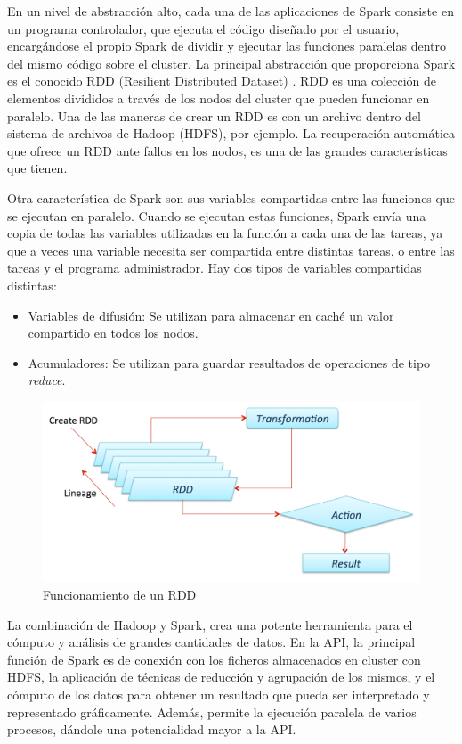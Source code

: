 En un nivel de abstracción alto, cada una de las aplicaciones de Spark consiste en un programa controlador, que ejecuta el código diseñado por el usuario, encargándose el propio Spark de dividir y ejecutar las funciones paralelas dentro del mismo código sobre el cluster.
La principal abstracción que proporciona Spark es el conocido RDD (Resilient Distributed Dataset) \cite{SparkRDD}. RDD es una colección de elementos divididos a través de los nodos del cluster que pueden funcionar en paralelo. Una de las maneras de crear un RDD es con un archivo dentro del sistema de archivos de Hadoop (HDFS), por ejemplo. La recuperación automática que ofrece un RDD ante fallos en los nodos, es una de las grandes características que tienen. 

Otra característica de Spark son sus variables compartidas entre las funciones que se ejecutan en paralelo. Cuando se ejecutan estas funciones, Spark envía una copia de todas las variables utilizadas en la función a cada una de las tareas, ya que a veces una variable necesita ser compartida entre distintas tareas, o entre las tareas y el programa administrador. Hay dos tipos de variables compartidas distintas:
\begin{itemize}
	\item Variables de difusión: Se utilizan para almacenar en caché un valor compartido en todos los nodos.
	\item Acumuladores: Se utilizan para guardar resultados de operaciones de tipo \textit{reduce}.
\end{itemize}

\begin{figure}
	\centering
	\includegraphics[width=1\linewidth]{imagenes/spark_rdd}
	\caption{Funcionamiento de un RDD \cite{SparkRDDFuncionamiento}}
	\label{fig:sparkrdd}
\end{figure}

La combinación de Hadoop y Spark, crea una potente herramienta para el cómputo y análisis de grandes cantidades de datos. En la API, la principal función de Spark es de conexión con los ficheros almacenados en cluster con HDFS, la aplicación de técnicas de reducción y agrupación de los mismos, y el cómputo de los datos para obtener un resultado que pueda ser interpretado y representado gráficamente.
Además, permite la ejecución paralela de varios procesos, dándole una potencialidad mayor a la API.

